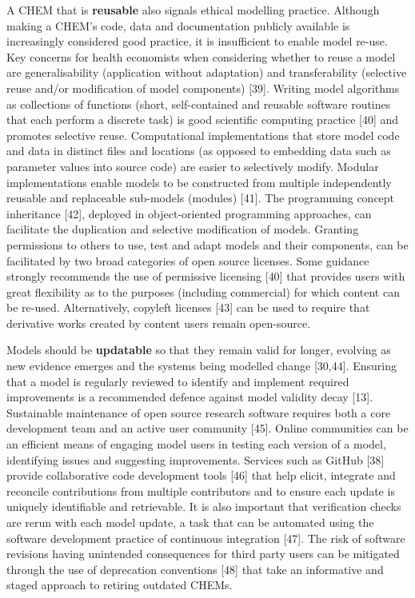 \documentclass[
]{article}
\begin{document}
A CHEM that is \textbf{reusable} also signals ethical modelling practice. Although making a CHEM's code, data and documentation publicly available is increasingly considered good practice, it is insufficient to enable model re-use. Key concerns for health economists when considering whether to reuse a model are generalisability (application without adaptation) and transferability (selective reuse and/or modification of model components) {[}39{]}. Writing model algorithms as collections of functions (short, self-contained and reusable software routines that each perform a discrete task) is good scientific computing practice {[}40{]} and promotes selective reuse. Computational implementations that store model code and data in distinct files and locations (as opposed to embedding data such as parameter values into source code) are easier to selectively modify. Modular implementations enable models to be constructed from multiple independently reusable and replaceable sub-models (modules) {[}41{]}. The programming concept inheritance {[}42{]}, deployed in object-oriented programming approaches, can facilitate the duplication and selective modification of models. Granting permissions to others to use, test and adapt models and their components, can be facilitated by two broad categories of open source licenses. Some guidance strongly recommends the use of permissive licensing {[}40{]} that provides users with great flexibility as to the purposes (including commercial) for which content can be re-used. Alternatively, copyleft licenses {[}43{]} can be used to require that derivative works created by content users remain open-source.

Models should be \textbf{updatable} so that they remain valid for longer, evolving as new evidence emerges and the systems being modelled change {[}30,44{]}. Ensuring that a model is regularly reviewed to identify and implement required improvements is a recommended defence against model validity decay {[}13{]}. Sustainable maintenance of open source research software requires both a core development team and an active user community {[}45{]}. Online communities can be an efficient means of engaging model users in testing each version of a model, identifying issues and suggesting improvements. Services such as GitHub {[}38{]} provide collaborative code development tools {[}46{]} that help elicit, integrate and reconcile contributions from multiple contributors and to ensure each update is uniquely identifiable and retrievable. It is also important that verification checks are rerun with each model update, a task that can be automated using the software development practice of continuous integration {[}47{]}. The risk of software revisions having unintended consequences for third party users can be mitigated through the use of deprecation conventions {[}48{]} that take an informative and staged approach to retiring outdated CHEMs.
\end{document}
